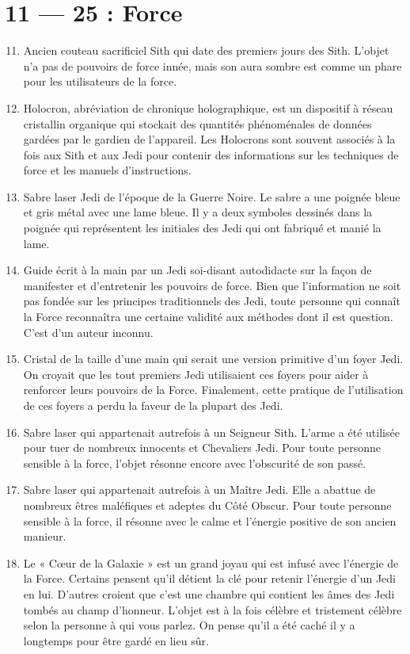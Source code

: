 \documentclass{article}
\begin{document}
\section*{11 --- 25 : Force}
\begin{enumerate}
	\setcounter{enumi}{10}
	\item Ancien couteau sacrificiel Sith qui date des premiers jours des Sith. L'objet n'a pas de pouvoirs de force innée, mais son aura sombre est comme un phare pour les utilisateurs de la force.
	\item Holocron, abréviation de chronique holographique, est un dispositif à réseau cristallin organique qui stockait des quantités phénoménales de données gardées par le gardien de l'appareil. Les Holocrons sont souvent associés à la fois aux Sith et aux Jedi pour contenir des informations sur les techniques de force et les manuels d'instructions.
	\item Sabre laser Jedi de l'époque de la Guerre Noire. Le sabre a une poignée bleue et gris métal avec une lame bleue. Il y a deux symboles dessinés dans la poignée qui représentent les initiales des Jedi qui ont fabriqué et manié la lame.
	\item Guide écrit à la main par un Jedi soi-disant autodidacte sur la façon de manifester et d'entretenir les pouvoirs de force. Bien que l'information ne soit pas fondée sur les principes traditionnels des Jedi, toute personne qui connaît la Force reconnaîtra une certaine validité aux méthodes dont il est question. C'est d'un auteur inconnu.
	\item Cristal de la taille d'une main qui serait une version primitive d'un foyer Jedi. On croyait que les tout premiers Jedi utilisaient ces foyers pour aider à renforcer leurs pouvoirs de la Force. Finalement, cette pratique de l'utilisation de ces foyers a perdu la faveur de la plupart des Jedi.
	\item Sabre laser qui appartenait autrefois à un Seigneur Sith. L'arme a été utilisée pour tuer de nombreux innocents et Chevaliers Jedi. Pour toute personne sensible à la force, l'objet résonne encore avec l'obscurité de son passé.
	\item Sabre laser qui appartenait autrefois à un Maître Jedi. Elle a abattue de nombreux êtres maléfiques et adeptes du Côté Obscur. Pour toute personne sensible à la force, il résonne avec le calme et l'énergie positive de son ancien manieur.
	\item Le « Cœur de la Galaxie » est un grand joyau qui est infusé avec l'énergie de la Force. Certains pensent qu'il détient la clé pour retenir l'énergie d'un Jedi en lui. D'autres croient que c'est une chambre qui contient les âmes des Jedi tombés au champ d'honneur. L'objet est à la fois célèbre et tristement célèbre selon la personne à qui vous parlez. On pense qu'il a été caché il y a longtemps pour être gardé en lieu sûr.

\end{enumerate}
\end{document}
